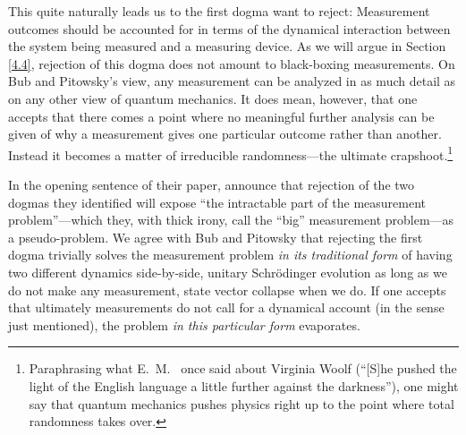 This quite naturally leads us to the first dogma \citet[p.\ 433]{Bub and Pitowsky 2010} want to reject: Measurement outcomes should be accounted for in terms of the dynamical interaction between the system being measured and a measuring device. As we will argue in Section \ref{4.4}, rejection of this dogma does not amount to black-boxing measurements. On Bub and Pitowsky's view, any measurement can be analyzed in as much detail as on any other view of quantum mechanics. It does mean, however, that one accepts that there comes a point where no meaningful further analysis can be given of why a measurement gives one particular outcome rather than another. Instead it becomes a matter of irreducible randomness---the ultimate crapshoot.\footnote{Paraphrasing what E.\ M.\ \citet[p.\ 28]{Forster 1942} once said about Virginia Woolf (``[S]he pushed the light of the English language a little further against the darkness''), one might say that quantum mechanics pushes physics right up to the point where total randomness takes over.} 

In the opening sentence of their paper, \citet[p.\ 433]{Bub and Pitowsky 2010} announce that rejection of the two dogmas they identified will expose ``the intractable part of the measurement problem''---which they, with thick irony, call the ``big'' measurement problem---as a pseudo-problem. We agree with Bub and Pitowsky that rejecting the first dogma trivially solves the measurement problem \emph{in its traditional form} of having two different dynamics side-by-side, unitary Schr\"odinger evolution as long as we do not make any measurement, state vector collapse when we do. If one accepts that ultimately measurements do not call for a dynamical account (in the sense just mentioned), the problem \emph{in this particular form} evaporates.

